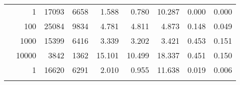\begin{table}
\begin{tabular}{rrrrrrrrr}
	            
	        
				\noalign{\smallskip}\hline
				\multirow{ 4 }{*}{ 80000 } &
				
					
					 
					\multirow{ 1 }{*}{ 1 } &
					
						
							    
							     17093  & 6658  
	                           & 1.588 & 0.780 & 10.287
	                           & 0.000 & 0.000  \\
	                
	            
					 &  
					 
					\multirow{ 1 }{*}{ 100 } &
					
						
							    
							     25084  & 9834  
	                           & 4.781 & 4.811 & 4.873
	                           & 0.148 & 0.049  \\
	                
	            
					 &  
					 
					\multirow{ 1 }{*}{ 1000 } &
					
						
							    
							     15399  & 6416  
	                           & 3.339 & 3.202 & 3.421
	                           & 0.453 & 0.151  \\
	                
	            
					 &  
					 
					\multirow{ 1 }{*}{ 10000 } &
					
						
							    
							     3842  & 1362  
	                           & 15.101 & 10.499 & 18.337
	                           & 0.451 & 0.150  \\
	                
	            
	        
				\noalign{\smallskip}\hline
				\multirow{ 4 }{*}{ 160000 } &
				
					
					 
					\multirow{ 1 }{*}{ 1 } &
					
						
							    
							     16620  & 6291  
	                           & 2.010 & 0.955 & 11.638
	                           & 0.019 & 0.006  \\
	                
	            
					 &  
					 

\end{tabular}
\end{table}
